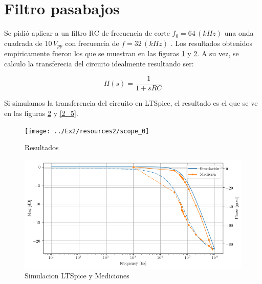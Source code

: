 \section{Filtro pasabajos}

Se pidió aplicar a un filtro RC de frecuencia de corte $f_{0}=64\,(kHz)$
una onda cuadrada de $10\,V_{pp}$ con frecuencia de $f=32\,(kHz)$
. Los resultados obtenidos empiricamente fueron los que se muestran
en las figuras \ref{2_1} y \ref{2_4}. A su vez, se calculo la transferecia
del circuito idealmente resultando ser:

\begin{equation}
H(s)=\frac{1}{1+sRC}\label{eq:2_4}
\end{equation}

Si simulamos la transferencia del circuito en LTSpice, el resultado
es el que se ve en las figuras \ref{2_4} y \ref{2_5}.

\begin{figure}[h]
\begin{centering}
\texttt{[image: ../Ex2/resources2/scope\_0]}
\par\end{centering}
\caption{Resultados}
\label{2_1}
\end{figure}

\begin{figure}[h]
\begin{centering}
\includegraphics[scale=0.65]{../Ex2/resources2/MedyPost}
\par\end{centering}
\caption{Simulacion LTSpice y Mediciones}
\label{2_4}

\end{figure}

